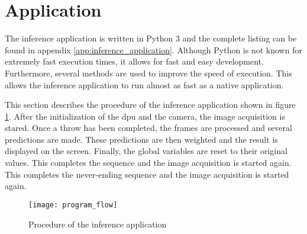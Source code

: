\section{Application}
\label{sec:inference:app}

The inference application is written in Python 3 and the complete listing can be found in appendix \ref{app:inference_application}.
Although Python is not known for extremely fast execution times, it allows for fast and easy development.
Furthermore, several methods are used to improve the speed of execution.
This allows the inference application to run almost as fast as a native application.

This section describes the procedure of the inference application shown in figure \ref{fig:procedure_inference_app}.
After the initialization of the \acrshort{dpu} and the camera, the image acquisition is stared.
Once a throw has been completed, the frames are processed and several predictions are made.
These predictions are then weighted and the result is displayed on the screen.
Finally, the global variables are reset to their original values.
This completes the sequence and the image acquisition is started again.
This completes the never-ending sequence and the image acquisition is started again.

\begin{figure}
  \centering
  \texttt{[image: program\_flow]} %
  \caption{Procedure of the inference application}
  \label{fig:procedure_inference_app}
\end{figure}


